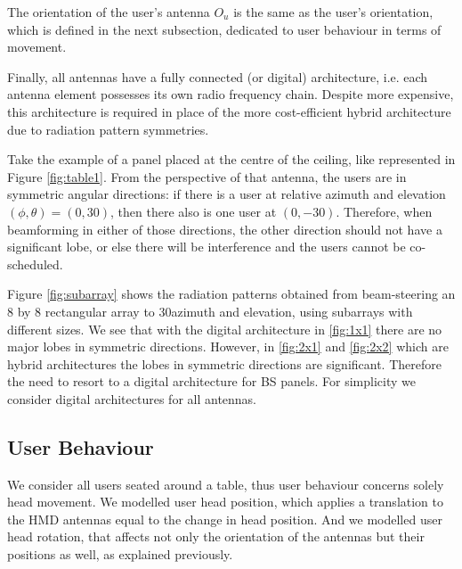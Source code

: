 
The orientation of the user's antenna $O_{u}$ is the same as the user's orientation, which is defined in the next subsection, dedicated to user behaviour in terms of movement.

Finally, all antennas have a fully connected (or digital) architecture, i.e. each antenna element possesses its own radio frequency chain. Despite more expensive, this architecture is required in place of the more cost-efficient hybrid architecture due to radiation pattern symmetries.

Take the example of a panel placed at the centre of the ceiling, like represented in Figure \ref{fig:table1}. From the perspective of that antenna, the users are in symmetric angular directions: if there is a user at relative azimuth and elevation $(\phi, \theta) = (0, 30)$, then there also is one user at $(0, -30)$. Therefore, when beamforming in either of those directions, the other direction should not have a significant lobe, or else there will be interference and the users cannot be co-scheduled. 

Figure \ref{fig:subarray} shows the radiation patterns obtained from beam-steering an 8 by 8 rectangular array to 30\tdeg azimuth and \tdeg elevation, using subarrays with different sizes. We see that with the digital architecture in \ref{fig:1x1} there are no major lobes in symmetric directions. However, in \ref{fig:2x1} and \ref{fig:2x2} which are hybrid architectures the lobes in symmetric directions are significant. Therefore the need to resort to a digital architecture for \ac{BS} panels. For simplicity we consider digital architectures for all antennas.



\subsection{User Behaviour}

We consider all users seated around a table, thus user behaviour concerns solely head movement. We modelled user head position, which applies a translation to the \ac{HMD} antennas equal to the change in head position. And we modelled user head rotation, that affects not only the orientation of the antennas but their positions as well, as explained previously.


